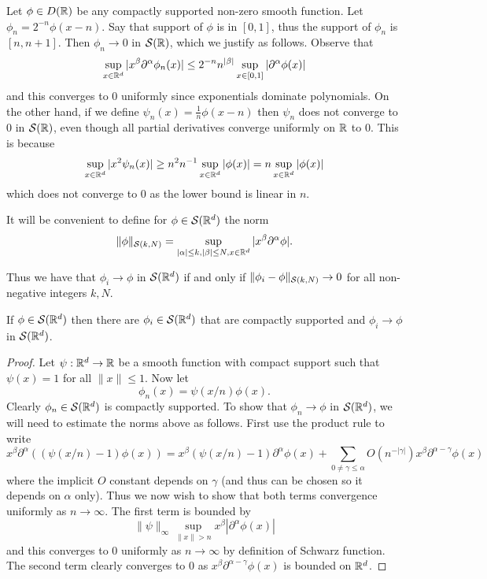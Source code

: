 \documentclass[twoside, a4paper, 10pt]{amsart}
\begin{document}
\begin{eg} \label{eg: schwarz convergence} Let $\phi \in D(\mathbb{R})$ be any compactly supported non-zero smooth function. Let $\phi_n = 2^{-n} \phi(x-n)$. Say that support of $\phi$ is in $[0,1]$, thus the support of $\phi_n$ is $[n,n+1]$. Then $\phi_n \to 0$ in $\mathcal{S}(\mathbb{R})$, which we justify as follows. Observe that $$\sup_{x \in \mathbb{R}^d}|x^{\beta} \partial^{\alpha}\phi_n(x)| \leq 2^{-n}n^{|\beta|} \sup_{x \in [0,1]} | \partial^{\alpha}\phi(x)|$$ and this converges to $0$ uniformly since exponentials dominate polynomials. On the other hand, if we define $\psi_n (x) = \frac{1}{n} \phi(x-n)$ then $\psi_n$ does not converge to $0$ in $\mathcal{S}(\mathbb{R})$, even though all partial derivatives converge uniformly on $\mathbb{R}$ to $0$. This is because $$\sup_{x \in \mathbb{R}^d} | x^2 \psi_n(x) | \geq n^2 n^{-1} \sup_{x \in \mathbb{R}^d} |\phi(x)| = n \sup_{x \in \mathbb{R}^d} |\phi(x)|$$ which does not converge to $0$ as the lower bound is linear in $n$.

\end{eg}

\begin{mydef} It will be convenient to define for $\phi \in \mathcal{S}(\mathbb{R}^d)$ the norm $$\| \phi \|_{\mathcal{S}(k,N)} = \sup_{|\alpha|\leq k, |\beta|\leq N, x \in \mathbb{R}^d} |x^{\beta} \partial^{\alpha} \phi| .$$

\end{mydef}

Thus we have that $\phi_i \to \phi$ in $\mathcal{S}(\mathbb{R}^d)$ if and only if $\| \phi_i - \phi\|_{\mathcal{S}(k,N)} \to 0$ for all non-negative integers $k,N$.

\begin{prop}\label{prop: Schwarz function is limit of compactly supported} If $\phi \in \mathcal{S}(\mathbb{R}^d)$ then there are $\phi_i \in \mathcal{S}(\mathbb{R}^d)$ that are compactly supported and $\phi_i \to \phi$ in $\mathcal{S}(\mathbb{R}^d)$.

\end{prop} 

\begin{proof} Let $\psi:\mathbb{R}^d \to \mathbb{R}$ be a smooth function with compact support such that $\psi(x) = 1$ for all $\|x \| \leq 1$. Now let $$\phi_n(x) = \psi(x/n) \phi(x).$$ Clearly $\phi_n \in \mathcal{S}(\mathbb{R}^d)$ is compactly supported. To show that $\phi_n \to \phi$ in $\mathcal{S}(\mathbb{R}^d)$, we will need to estimate the norms above as follows. First use the product rule to write $$x^{\beta} \partial^{\alpha}\left( (\psi(x/n) - 1) \phi(x) \right) =  x^{\beta} (\psi(x/n) - 1) \partial^{\alpha} \phi(x)  + \sum_{0 \neq \gamma \leq \alpha} O(n^{-|\gamma|}) x^{\beta}\partial^{\alpha - \gamma} \phi(x) $$ where the implicit $O$ constant depends on $\gamma$ (and thus can be chosen so it depends on $\alpha$ only). Thus we now wish to show that both terms convergence uniformly as $n \to \infty$. The first term is bounded by $$\|\psi\|_{\infty} \sup_{\|x\| > n} x^{\beta}  |\partial^{\alpha} \phi(x)|$$ and this converges to $0$ uniformly as $n \to \infty$ by definition of Schwarz function. The second term clearly converges to $0$ as $x^{\beta} \partial^{\alpha - \gamma}\phi(x)$ is bounded on $\mathbb{R}^d$. \end{proof}
\end{document}
